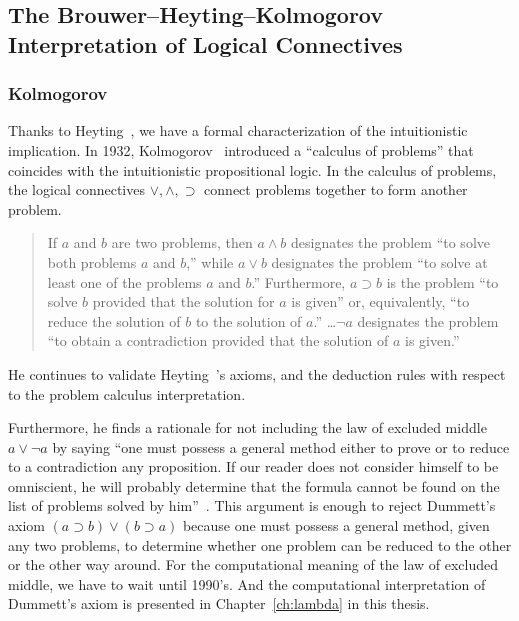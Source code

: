 \subsection{The Brouwer--Heyting--Kolmogorov Interpretation of Logical Connectives}

\subsubsection{Kolmogorov}

Thanks to Heyting~\cite{heyting1930}, we have a formal
characterization of the intuitionistic implication.
In 1932, Kolmogorov~\cite{kolmogorov1932} introduced a ``calculus of problems''
that coincides with the intuitionistic propositional logic.
In the calculus of problems, the logical connectives $\vee, \wedge,
\supset$ connect problems together to form another problem.
 \begin{quote}
  If $a$ and $b$ are two problems, then $a\land b$ designates the
  problem ``to solve both problems $a$ and $b$,'' while $a\lor b$
  designates the problem ``to solve at least one of the problems $a$ and
  $b$.''  Furthermore, $a\supset b$ is the problem ``to solve $b$
  provided that the solution for $a$ is given'' or, equivalently, ``to
  reduce the solution of $b$ to the solution of
  $a$.''  \ldots $\neg a$ designates the problem ``to obtain a
  contradiction provided that the solution of $a$ is
  given.''~\cite[p.~329]{kolmogorov1932}
 \end{quote}
 He continues to validate Heyting~\cite{heyting1930}'s axioms, and the
 deduction rules with respect to the problem calculus interpretation.

 Furthermore, he finds a rationale for not including the law of excluded
 middle $a\lor \neg a$ by saying ``one must possess a general method
 either to prove or to reduce to a contradiction any proposition.  If
 our reader does not consider himself to be omniscient, he will probably
 determine that the formula cannot be found on the list of problems
 solved by him''~\cite{kolmogorov1932}.
 This argument is enough to reject Dummett's axiom $(a\supset b)\lor
 (b\supset a)$ because one must possess a general method, given any two
 problems, to
 determine whether
 one problem can be reduced to the other or the other way around.
 For the computational meaning of the law of excluded middle, we have to
 wait until 1990's.
 And the computational interpretation of Dummett's axiom is
 presented in Chapter~\ref{ch:lambda} in this thesis.

